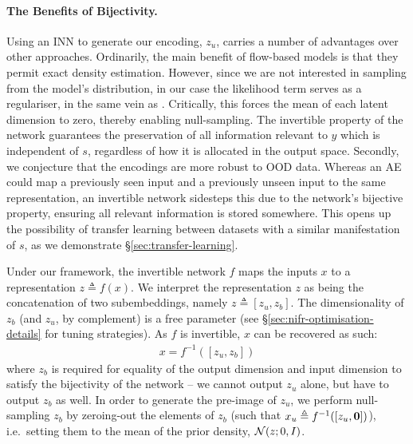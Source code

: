 \paragraph{The Benefits of Bijectivity.}
%
Using an \ac{INN} to generate our encoding, $z_u$, carries a number of advantages over other
approaches. 
%
Ordinarily, the main benefit of flow-based models is that they permit exact density estimation.
%
However, since we are not interested in sampling from the model's distribution, in our case the
likelihood term serves as a regulariser, in the same vein as \citet{JacSmeOya18}.
%
Critically, this forces the mean of each latent dimension to zero, thereby enabling null-sampling.
%
The invertible property of the network guarantees the preservation of all information relevant to
$y$ which is independent of $s$, regardless of how it is allocated in the output space. 
%
Secondly, we conjecture that the encodings are more robust to \ac{OOD} data. 
%
%
Whereas an \acf{AE} could map a previously seen input and a previously unseen input to the same
representation, an invertible network sidesteps this due to the network's bijective property,
ensuring all relevant information is stored somewhere. 
%
This opens up the possibility of transfer learning between datasets with a similar manifestation of
$s$, as we demonstrate \S\ref{sec:transfer-learning}.

Under our framework, the invertible network $f$ maps the inputs $x$ to a representation
$z \triangleq f(x)$.
%
We interpret the representation $z$ as being the concatenation of two subembeddings, namely \( z
\triangleq [z_u, z_b] \). 
%
The dimensionality of $z_b$ (and $z_u$, by complement) is a free parameter (see
\S\ref{sec:nifr-optimisation-details} for tuning strategies). 
%
As $f$ is invertible, $x$ can be recovered as such:
%
\begin{align}
  x = f^{-1}([z_u, z_b])
  \label{eq:zreconstruct}
\end{align}
%
where $z_b$ is required for equality of the output dimension and input dimension to satisfy
the bijectivity of the network -- we cannot output $z_u$ alone, but have to output $z_b$
as well. 
%
In order to generate the pre-image of $z_u$, we perform null-sampling \wrt{} $z_b$ by zeroing-out
the elements of $z_b$ (such that $x_u \triangleq f^{-1}([z_{u}, {\bm{0}}])$), i.e.\ setting them to
the mean of the prior density, ${\mathcal{N}}(z;0, I)$.

